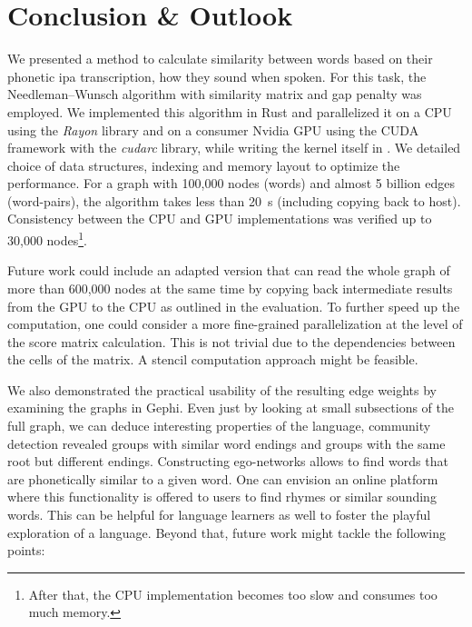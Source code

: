 \pagebreak

\section{Conclusion \& Outlook}
\label{sec:conclusion}

We presented a method to calculate similarity between words based on their phonetic \gls{ipa} transcription, \ie how they sound when spoken. For this task, the Needleman–Wunsch algorithm with similarity matrix and gap penalty was employed. We implemented this algorithm in Rust and parallelized it on a CPU using the \textit{Rayon} library and on a consumer Nvidia GPU using the CUDA framework with the \textit{cudarc} library, while writing the kernel itself in \Cpp. We detailed choice of data structures, indexing and memory layout to optimize the performance. For a graph with 100,000 nodes (words) and almost 5 billion edges (word-pairs), the algorithm takes less than \qty{20}{\s} (including copying back to host). Consistency between the CPU and GPU implementations was verified up to 30,000 nodes\footnote{After that, the CPU implementation becomes too slow and consumes too much memory.}.

Future work could include an adapted version that can read the whole graph of more than 600,000 nodes at the same time by copying back intermediate results from the GPU to the CPU as outlined in the evaluation. To further speed up the computation, one could consider a more fine-grained parallelization at the level of the score matrix calculation. This is not trivial due to the dependencies between the cells of the matrix. A stencil computation approach might be feasible.

We also demonstrated the practical usability of the resulting edge weights by examining the graphs in Gephi. Even just by looking at small subsections of the full graph, we can deduce interesting properties of the language, \eg community detection revealed groups with similar word endings and groups with the same root but different endings. Constructing ego-networks allows to find words that are phonetically similar to a given word. One can envision an online platform where this functionality is offered to users to find rhymes or similar sounding words. This can be helpful for language learners as well to foster the playful exploration of a language. Beyond that, future work might tackle the following points:

